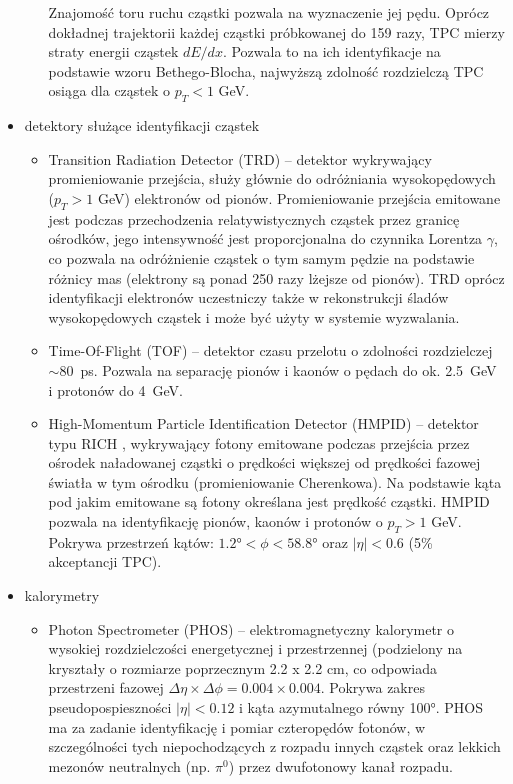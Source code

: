 \begin{itemize}
\begin{itemize}
		Znajomość toru ruchu cząstki pozwala na wyznaczenie jej pędu. Oprócz dokładnej trajektorii każdej cząstki próbkowanej do 159 razy, TPC mierzy straty energii cząstek $dE/dx$. Pozwala to na ich identyfikacje na podstawie wzoru Bethego-Blocha, najwyższą zdolność rozdzielczą TPC osiąga dla cząstek o $p_T < 1$ GeV.
	\end{itemize}
	\item detektory służące identyfikacji cząstek 
	\begin{itemize}
		\item Transition Radiation Detector (TRD) -- detektor wykrywający promieniowanie przejścia, służy głównie do odróżniania wysokopędowych ($p_T > 1$ GeV) elektronów od pionów. Promieniowanie przejścia emitowane jest podczas przechodzenia relatywistycznych cząstek przez granicę ośrodków, jego intensywność jest proporcjonalna do czynnika Lorentza $\gamma$, co pozwala na odróżnienie cząstek o tym samym pędzie na podstawie różnicy mas (elektrony są ponad 250 razy lżejsze od pionów). TRD oprócz identyfikacji elektronów uczestniczy także w rekonstrukcji śladów wysokopędowych cząstek i może być użyty w systemie wyzwalania.
		\item Time-Of-Flight (TOF) -- detektor czasu przelotu o zdolności rozdzielczej $\sim80$~ps. Pozwala na separację pionów i kaonów o pędach do ok. 2.5~GeV i protonów do 4~GeV.  
		\item High-Momentum Particle Identification Detector (HMPID) -- detektor typu RICH , wykrywający fotony emitowane podczas przejścia przez ośrodek naładowanej cząstki o prędkości większej od prędkości fazowej światła w tym ośrodku (promieniowanie Cherenkowa). Na podstawie kąta pod jakim emitowane są fotony określana jest prędkość cząstki. HMPID pozwala na identyfikację pionów, kaonów i protonów o $p_T > 1$ GeV. Pokrywa przestrzeń kątów: $\ang{1.2} < \phi < \ang{58.8}$ oraz $|\eta| < 0.6$ (5\% akceptancji TPC).
	\end{itemize}
	\item kalorymetry
	\begin{itemize}
		\item Photon Spectrometer (PHOS) -- elektromagnetyczny kalorymetr o wysokiej rozdzielczości energetycznej i przestrzennej (podzielony na kryształy o rozmiarze poprzecznym 2.2 x 2.2 cm, co odpowiada przestrzeni fazowej $\Delta\eta\times\Delta\phi = 0.004 \times 0.004$. Pokrywa zakres pseudopospieszności $|\eta| < 0.12$ i kąta azymutalnego równy \ang{100}. PHOS ma za zadanie identyfikację i pomiar czteropędów fotonów, w szczególności tych niepochodzących z rozpadu innych cząstek  oraz lekkich mezonów neutralnych (np. $\pi^0$) przez dwufotonowy kanał rozpadu.

\end{itemize}
\end{itemize}
